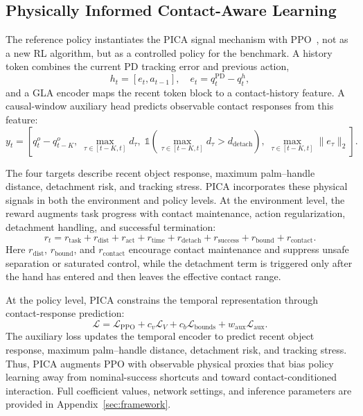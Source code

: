 \documentclass{article}
\begin{document}
\subsection{Physically Informed Contact-Aware Learning}
\label{sec:pica}

The reference policy instantiates the PICA signal mechanism with PPO~\cite{schulman2017proximal},
not as a new RL algorithm, but as a controlled policy for the
benchmark. A history token combines the current PD tracking error
and previous action,
\begin{equation}
h_t=[e_t,a_{t-1}],\quad e_t=q_t^{\mathrm{PD}}-q_t^h,
\label{eq:token_main}
\end{equation}
and a GLA encoder\cite{yang2024gated} maps the recent token block to a contact-history
feature. A causal-window auxiliary head predicts observable contact
responses from this feature:
\begin{equation}
y_t = \left[
q_t^o-q_{t-K}^o,\;
\max_{\tau\in[t-K,t]}d_\tau,\;
\mathbb{1}\!\left(\max_{\tau\in[t-K,t]}d_\tau>d_{\mathrm{detach}}\right),\;
\max_{\tau\in[t-K,t]}\lVert e_\tau\rVert_2
\right].
\label{eq:aux_main}
\end{equation}




The four targets describe recent object response, maximum
palm--handle distance, detachment risk, and tracking stress. PICA
incorporates these physical signals in both the environment and policy
levels. At the environment level, the reward augments task progress
with contact maintenance, action regularization, detachment handling,
and successful termination:
\begin{equation}
r_t =
r_{\mathrm{task}}
+ r_{\mathrm{dist}}
+ r_{\mathrm{act}}
+ r_{\mathrm{time}}
+ r_{\mathrm{detach}}
+ r_{\mathrm{success}}
+ r_{\mathrm{bound}}
+ r_{\mathrm{contact}} .
\label{eq:pica_reward_main}
\end{equation}
Here $r_{\mathrm{dist}}$, $r_{\mathrm{bound}}$, and
$r_{\mathrm{contact}}$ encourage contact maintenance and suppress
unsafe separation or saturated control, while the detachment term is
triggered only after the hand has entered and then leaves the effective
contact range.

At the policy level, PICA constrains the temporal representation
through contact-response prediction:
\begin{equation}
\mathcal{L} =
\mathcal{L}_{\mathrm{PPO}}
+ c_v \mathcal{L}_V
+ c_b \mathcal{L}_{\mathrm{bounds}}
+ w_{\mathrm{aux}} \mathcal{L}_{\mathrm{aux}} .
\label{eq:pica_objective_main}
\end{equation}
The auxiliary loss updates the temporal encoder to predict recent
object response, maximum palm--handle distance, detachment risk, and
tracking stress. Thus, PICA augments PPO with observable physical
proxies that bias policy learning away from nominal-success shortcuts
and toward contact-conditioned interaction. Full coefficient values,
network settings, and inference parameters are provided in
Appendix~\ref{sec:framework}.
\end{document}
